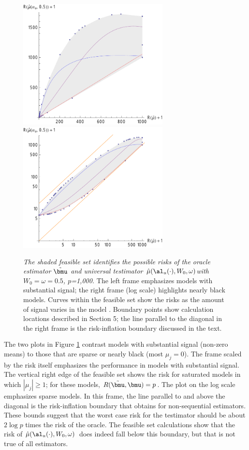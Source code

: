 \documentclass{gSCS2e}
\newcommand{\uTest}{\mbox{$\hat\mu(\al_u(\cdot),W_0,\omega)$}}
\begin{document}
 \begin{figure}
 \caption{ \label{fig:riFeasibleSet} {\sl The shaded feasible set identifies the possible
 risks of the oracle estimator $\tilde{\bmu}$ and universal testimator \uTest with
 $W_0=\omega=0.5$, $p$=1,000.} The left frame emphasizes models with substantial signal;
 the right frame (log scale) highlights nearly black models. Curves within the feasible
 set show the risks as the amount of signal varies in the model . Boundary points
 show calculation locations described in Section 5; the line parallel to the diagonal in
 the right frame is the risk-inflation boundary discussed in the text.}

 \vspace{0.1in}
\centerline{
 \includegraphics[width=3.0in]{figures/riFeasSet}
 \includegraphics[width=3.0in]{figures/riFeasSetLog} }
 \vspace{0.2in}
 \end{figure}


 The two plots in Figure \ref{fig:riFeasibleSet} contrast models with substantial signal
 (non-zero means) to those that are sparse or nearly black (most $\mu_j=0$).  The frame
 scaled by the risk itself emphasizes the performance in models with substantial signal.
  The vertical right edge of the feasible set shows the risk for saturated models in which
 $|\mu_j| \ge 1$; for these models, $R(\tilde{\bmu}, \bmu) = p$.  The plot on the log
 scale emphasizes sparse models.  In this frame, the line parallel to and above the
 diagonal is the risk-inflation boundary  that obtains for non-sequential
 estimators.  These bounds suggest that the worst case risk for the testimator should be
 about $2 \log p$ times the risk of the oracle.  The feasible set calculations show that
 the risk of \uTest\ does indeed fall below this boundary, but that is not true of all
 estimators.
\end{document}
